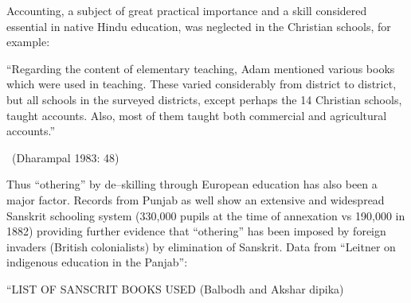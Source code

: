 Accounting, a subject of great practical importance and a skill considered essential in native Hindu education, was neglected in the Christian schools, for example:

\begin{myquote}
“Regarding the content of elementary teaching, Adam mentioned various books which were used in teaching. These varied considerably from district to district, but all schools in the surveyed districts, except perhaps the 14 Christian schools, taught accounts. Also, most of them taught both commercial and agricultural accounts.” 

~\hfill (Dharampal 1983: 48)
\end{myquote}

Thus “othering” by de–skilling through European education has also been a major factor. Records from Punjab as well show an extensive and widespread Sanskrit schooling system (330,000 pupils at the time of annexation vs 190,000 in 1882) providing further evidence that “othering” has been imposed by foreign invaders (British colonialists) by elimination of Sanskrit. Data from “Leitner on indigenous education in the Panjab”:

“LIST OF SANSCRIT BOOKS USED (Balbodh and Akshar dipika)


